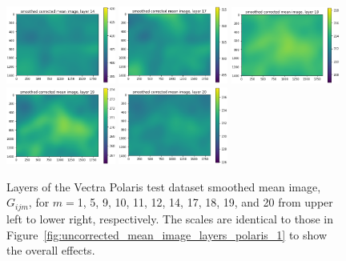 \documentclass[letterpaper,11pt]{article}
\newcommand{\reffig}[1]{Figure~\ref{#1}}
\begin{document}
\begin{figure}[!ht]
\includegraphics[width=0.32\textwidth]{images/results/smoothed_corrected_mean_image_layers_polaris/smoothed_corrected_mean_image_layer_14_same_scale}
\includegraphics[width=0.32\textwidth]{images/results/smoothed_corrected_mean_image_layers_polaris/smoothed_corrected_mean_image_layer_17_same_scale}
\includegraphics[width=0.32\textwidth]{images/results/smoothed_corrected_mean_image_layers_polaris/smoothed_corrected_mean_image_layer_18_same_scale}
\includegraphics[width=0.32\textwidth]{images/results/smoothed_corrected_mean_image_layers_polaris/smoothed_corrected_mean_image_layer_19_same_scale}
\includegraphics[width=0.32\textwidth]{images/results/smoothed_corrected_mean_image_layers_polaris/smoothed_corrected_mean_image_layer_20_same_scale}
\caption{\footnotesize Layers of the Vectra Polaris test dataset smoothed mean image, $G_{ijm}$, for $m=$1, 5, 9, 10, 11, 12, 14, 17, 18, 19, and 20 from upper left to lower right, respectively. The scales are identical to those in \reffig{fig:uncorrected_mean_image_layers_polaris_1} to show the overall effects.}
\label{fig:corrected_smoothed_mean_image_layers_same_scale_polaris_1}
\end{figure}
\end{document}
